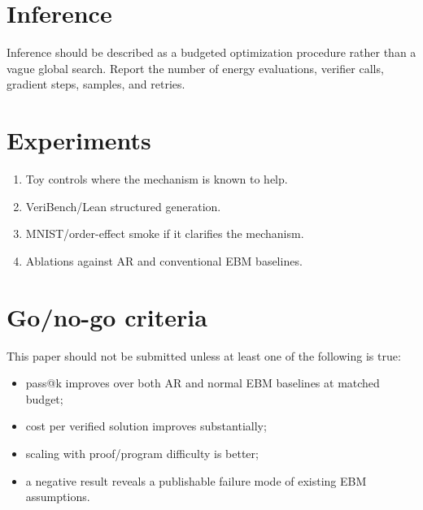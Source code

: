 \documentclass[11pt]{article}
\begin{document}
\section{Inference}

Inference should be described as a budgeted optimization procedure rather than a
vague global search.
Report the number of energy evaluations, verifier calls, gradient steps, samples,
and retries.

\section{Experiments}

\begin{enumerate}[leftmargin=2em]
  \item Toy controls where the mechanism is known to help.
  \item VeriBench/Lean structured generation.
  \item MNIST/order-effect smoke if it clarifies the mechanism.
  \item Ablations against AR and conventional EBM baselines.
\end{enumerate}

\section{Go/no-go criteria}

This paper should not be submitted unless at least one of the following is true:

\begin{itemize}[leftmargin=2em]
  \item pass@k improves over both AR and normal EBM baselines at matched budget;
  \item cost per verified solution improves substantially;
  \item scaling with proof/program difficulty is better;
  \item a negative result reveals a publishable failure mode of existing EBM
        assumptions.
\end{itemize}
\end{document}
